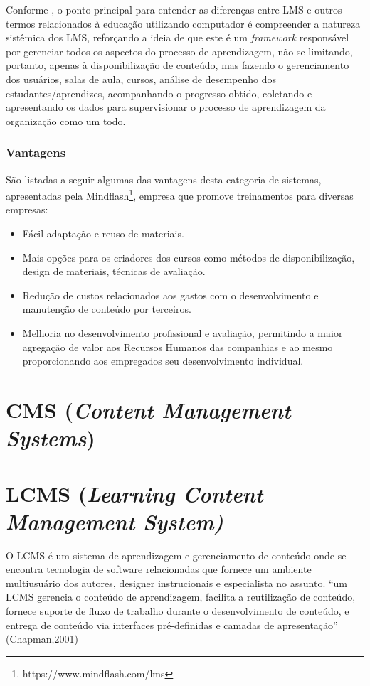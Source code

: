 \documentclass[12pt]{article}
\begin{document}
Conforme \cite{watson2007learning}, o ponto principal para entender as diferenças entre LMS e outros termos relacionados à educação utilizando 
computador é compreender a natureza sistêmica dos LMS, reforçando a ideia de que este é um \textit{framework} responsável por gerenciar todos 
os aspectos do processo de aprendizagem, não se limitando, portanto, apenas à disponibilização de conteúdo, mas fazendo o gerenciamento dos 
usuários, salas de aula, cursos, análise de desempenho dos estudantes/aprendizes, acompanhando o progresso obtido, coletando e apresentando os 
dados para supervisionar o processo de aprendizagem da organização como um todo.

\subsubsection{Vantagens}

São listadas a seguir algumas das vantagens desta categoria de sistemas, apresentadas pela Mindflash\footnote{https://www.mindflash.com/lms}, 
empresa que promove treinamentos para diversas empresas:

\begin{itemize}
 \item Fácil adaptação e reuso de materiais.
 \item Mais opções para os criadores dos cursos como métodos de disponibilização, design de materiais, técnicas de avaliação.
 \item Redução de custos relacionados aos gastos com o desenvolvimento e manutenção de conteúdo por terceiros.
 \item Melhoria no desenvolvimento profissional e avaliação, permitindo a maior agregação de valor aos Recursos Humanos das companhias e ao mesmo 
 proporcionando aos empregados seu desenvolvimento individual.
\end{itemize}

\section{CMS (\textit{Content Management Systems})}

\section{LCMS (\textit{Learning Content Management System)}}

O LCMS é um sistema de aprendizagem e gerenciamento de conteúdo onde se encontra tecnologia de software relacionadas que fornece um ambiente 
multiusuário dos autores, designer instrucionais e especialista no assunto. “um LCMS gerencia o conteúdo de aprendizagem, facilita a reutilização 
de conteúdo, fornece suporte de fluxo de trabalho durante o desenvolvimento de conteúdo, e entrega de conteúdo via interfaces pré-definidas e 
camadas de apresentação” (Chapman,2001)
\end{document}
